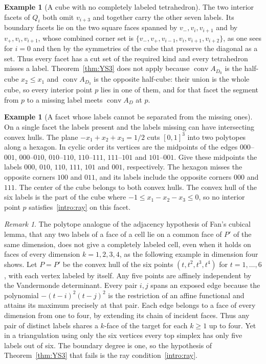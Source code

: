 \documentclass[11pt]{amsart}
\theoremstyle{definition}
\newtheorem{ex}[thm]{Example}
\theoremstyle{remark}
\newtheorem{rem}[thm]{Remark}
\numberwithin{equation}{section}
\DeclareMathOperator{\conv}{conv}
\begin{document}
\begin{ex}[A cube with no completely labeled tetrahedron]
The two interior facets of $Q_i$ both omit $v_{i+3}$ and together carry the other seven labels. Its boundary facets lie on the two square faces spanned by $v_{-},v_i,v_{i+1}$ and by $v_{+},v_i,v_{i+1}$, whose combined corner set is $\{v_{-},v_{+},v_{i-1},v_i,v_{i+1},v_{i+2}\}$, as one sees for $i=0$ and then by the symmetries of the cube that preserve the diagonal as a set. Thus every facet has a cut set of the required kind and every tetrahedron misses a label. Theorem~\ref{thm:YS3} does not apply because $\conv A_{D_0}$ is the half-cube $x_2\le x_1$ and $\conv A_{D_3}$ is the opposite half-cube: their union is the whole cube, so every interior point $p$ lies in one of them, and for that facet the segment from $p$ to a missing label meets $\conv A_D$ at $p$.
\end{ex}

\begin{ex}[A facet whose labels cannot be separated from the missing ones]\label{ex:hexagon}
On a single facet the labels present and the labels missing can have intersecting convex hulls. The plane $-x_1+x_2+x_3=1/2$ cuts $[0,1]^3$ into two polytopes along a hexagon. In cyclic order its vertices are the midpoints of the edges $000$--$001$, $000$--$010$, $010$--$110$, $110$--$111$, $111$--$101$ and $101$--$001$. Give these midpoints the labels $000$, $010$, $110$, $111$, $101$ and $001$, respectively. The hexagon misses the opposite corners $100$ and $011$, and its labels include the opposite corners $000$ and $111$. The center of the cube belongs to both convex hulls. The convex hull of the six labels is the part of the cube where $-1\le x_1-x_2-x_3\le0$, so no interior point $p$ satisfies~\eqref{intro:ray} on this facet.
\end{ex}

\begin{rem}
The polytope analogue of the adjacency hypothesis of Fan's cubical lemma, that any two labels of a face of a cell lie on a common face of $P'$ of the same dimension, does not give a completely labeled cell, even when it holds on faces of every dimension $k=1,2,3,4$, as the following example in dimension four shows. Let $P=P'$ be the convex hull of the six points $(t,t^2,t^3,t^4)$ for $t=1,\ldots,6$, with each vertex labeled by itself. Any five points are affinely independent by the Vandermonde determinant. Every pair $i,j$ spans an exposed edge because the polynomial $-(t-i)^2(t-j)^2$ is the restriction of an affine functional and attains its maximum precisely at that pair. Each edge belongs to a face of every dimension from one to four, by extending its chain of incident faces. Thus any pair of distinct labels shares a $k$-face of the target for each $k\ge1$ up to four. Yet in a triangulation using only the six vertices every top simplex has only five labels out of six. The boundary degree is one, so the hypothesis of Theorem~\ref{thm:YS3} that fails is the ray condition~\eqref{intro:ray}.
\end{rem}
\end{document}
